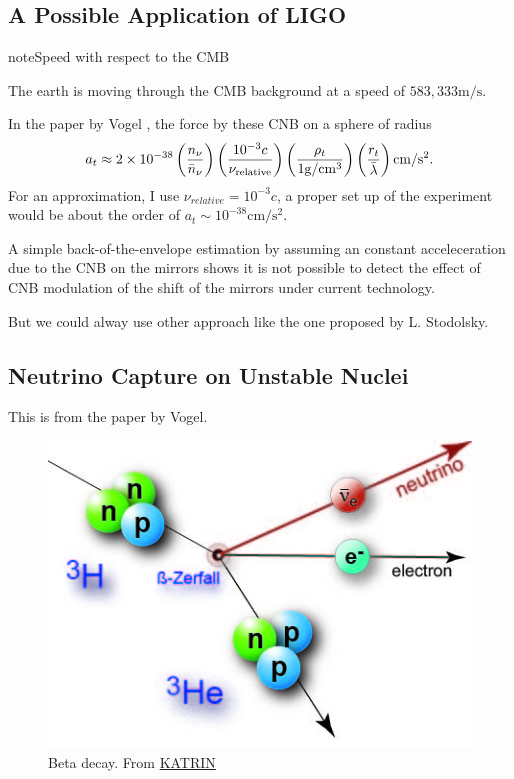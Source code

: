 \documentclass[letterpaper,12pt,english]{sphinxmanual}
\begin{document}
\subsection{A Possible Application of LIGO}
\label{cosmology:a-possible-application-of-ligo}
\begin{notice}{note}{Speed with respect to the CMB}

The earth is moving through the CMB background at a speed of \(583,333\mathrm{m/s}\).
\end{notice}

In the paper by Vogel \footnotemark[1], the force by these CNB on a sphere of radius
\begin{gather}
\begin{split}a_t \approx 2\times 10^{-38} \left( \frac{n_\nu}{\bar n_\nu} \right) \left( \frac{10^{-3}c}{\nu_{\mathrm{relative}}}  \right) \left( \frac{\rho_t}{1\mathrm{g/cm^3}} \right)  \left( \frac{r_t}{\bar\lambda} \right) \mathrm{cm/s^2}.\end{split}\notag
\end{gather}
For an approximation, I use \(\nu_{relative}=10^{-3}c\), a proper set up of the experiment would be about the order of \(a_t\sim 10^{-38}\mathrm{cm/s^2}\).

A simple back-of-the-envelope estimation by assuming an constant acceleceration due to the CNB on the mirrors shows it is not possible to detect the effect of CNB modulation of the shift of the mirrors under current technology.

But we could alway use other approach like the one proposed by L. Stodolsky. \footnotemark[4]


\subsection{Neutrino Capture on Unstable Nuclei}
\label{cosmology:neutrino-capture-on-unstable-nuclei}
This is from the paper by Vogel. \footnotemark[1]
\begin{figure}[htbp]
\centering
\capstart

\includegraphics{bdecay.jpg}
\caption{Beta decay. From \href{https://www.katrin.kit.edu/79.php}{KATRIN}}\end{figure}
\end{document}
